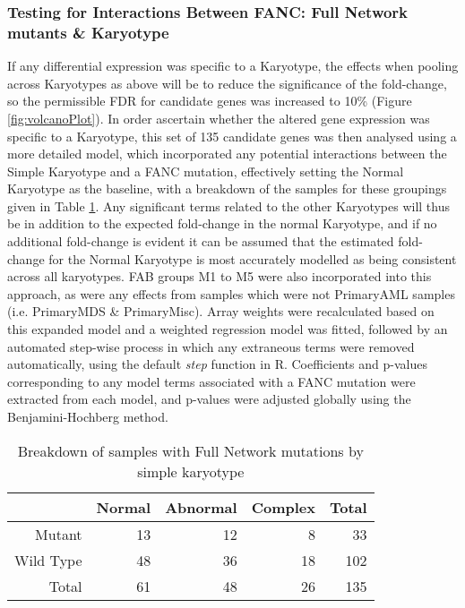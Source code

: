 \documentclass{article}\usepackage{knitr}
\begin{document}
\subsubsection{Testing for Interactions Between FANC: Full Network mutants \& Karyotype}
If any differential expression was specific to a Karyotype, the effects when pooling across Karyotypes as above will be to reduce the significance of the fold-change, so the permissible FDR for candidate genes was increased to 10\% (Figure \ref{fig:volcanoPlot}).
In order ascertain whether the altered gene expression was specific to a Karyotype, this set of 135 candidate genes was then analysed using a more detailed model, which incorporated any potential interactions between the Simple Karyotype and a FANC mutation, effectively setting the Normal Karyotype as the baseline, with a breakdown of the samples for these groupings given in Table \ref{tab:FFNbySimpKaryo}.
Any significant terms related to the other Karyotypes will thus be in addition to the expected fold-change in the normal Karyotype, and if no additional fold-change is evident it can be assumed that the estimated fold-change for the Normal Karyotype is most accurately modelled as being consistent across all karyotypes.
FAB groups M1 to M5 were also incorporated into this approach, as were any effects from samples which were not PrimaryAML samples (i.e. PrimaryMDS \& PrimaryMisc).
Array weights were recalculated based on this expanded model and a weighted regression model was fitted, followed by an automated step-wise process in which any extraneous terms were removed automatically, using the default \textit{step} function in R.
Coefficients and p-values corresponding to any model terms associated with a FANC mutation were extracted from each model, and p-values were adjusted globally using the Benjamini-Hochberg method.


\begin{table}[ht]
\centering
\begin{tabular}{rrrrr}
  \hline
 & Normal & Abnormal & Complex & Total \\ 
  \hline
Mutant & 13 & 12 & 8 & 33 \\ 
  Wild Type & 48 & 36 & 18 & 102 \\ 
   \hline
Total & 61 & 48 & 26 & 135 \\ 
   \hline
\end{tabular}
\caption{Breakdown of samples with Full Network mutations by simple karyotype} 
\label{tab:FFNbySimpKaryo}
\end{table}
\end{document}
